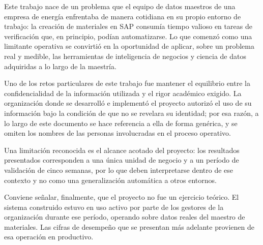 Este trabajo nace de un problema que el equipo de datos maestros de una empresa de energía enfrentaba de manera cotidiana en su propio entorno de trabajo: la creación de materiales en SAP consumía tiempo valioso en tareas de verificación que, en principio, podían automatizarse. Lo que comenzó como una limitante operativa se convirtió en la oportunidad de aplicar, sobre un problema real y medible, las herramientas de inteligencia de negocios y ciencia de datos adquiridas a lo largo de la maestría.

Uno de los retos particulares de este trabajo fue mantener el equilibrio entre la confidencialidad de la información utilizada y el rigor académico exigido. La organización donde se desarrolló e implementó el proyecto autorizó el uso de su información bajo la condición de que no se revelara su identidad; por esa razón, a lo largo de este documento se hace referencia a ella de forma genérica, y se omiten los nombres de las personas involucradas en el proceso operativo.

Una limitación reconocida es el alcance acotado del proyecto: los resultados presentados corresponden a una única unidad de negocio y a un período de validación de cinco semanas, por lo que deben interpretarse dentro de ese contexto y no como una generalización automática a otros entornos.

Conviene señalar, finalmente, que el proyecto no fue un ejercicio teórico. El sistema construido estuvo en uso activo por parte de los gestores de la organización durante ese período, operando sobre datos reales del maestro de materiales. Las cifras de desempeño que se presentan más adelante provienen de esa operación en productivo.